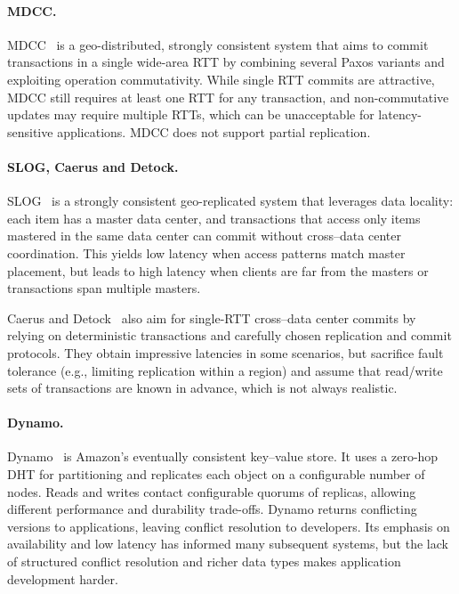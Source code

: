 \paragraph{MDCC.}

MDCC~\cite{mdcc} is a geo-distributed, strongly consistent system that aims to
commit transactions in a single wide-area RTT by combining several Paxos
variants and exploiting operation commutativity. While single RTT commits are
attractive, MDCC still requires at least one RTT for any transaction, and
non-commutative updates may require multiple RTTs, which can be unacceptable for
latency-sensitive applications. MDCC does not support partial replication.

\paragraph{SLOG, Caerus and Detock.}

SLOG~\cite{slog} is a strongly consistent geo-replicated system that leverages
data locality: each item has a master data center, and transactions that access
only items mastered in the same data center can commit without cross–data center
coordination. This yields low latency when access patterns match master
placement, but leads to high latency when clients are far from the masters or
transactions span multiple masters.

Caerus and Detock~\cite{caerus,detock} also aim for single-RTT cross–data center
commits by relying on deterministic transactions and carefully chosen replication
and commit protocols. They obtain impressive latencies in some scenarios, but
sacrifice fault tolerance (e.g., limiting replication within a region) and
assume that read/write sets of transactions are known in advance, which is not
always realistic.

\paragraph{Dynamo.}

Dynamo~\cite{dynamo} is Amazon’s eventually consistent key–value
store. It uses a zero-hop DHT for partitioning and replicates each object on a
configurable number of nodes. Reads and writes contact configurable quorums of
replicas, allowing different performance and durability trade-offs. Dynamo
returns conflicting versions to applications, leaving conflict resolution to
developers. Its emphasis on availability and low latency has informed many
subsequent systems, but the lack of structured conflict resolution and richer
data types makes application development harder.

